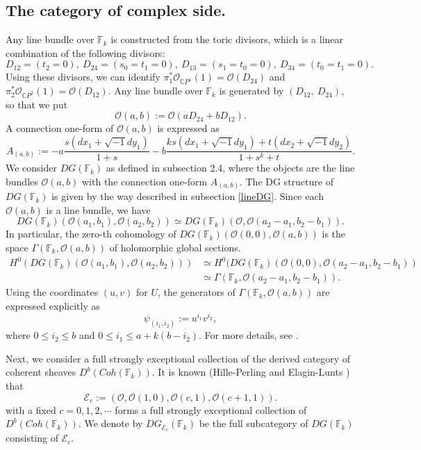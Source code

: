 \documentclass[12pt,reqno]{amsart}
\newcommand{\C}{{\mathbb{C}}}
\newcommand{\F}{{\mathbb{F}}}
\newcommand{\Fk}{{\F_k}}
\newcommand{\cO}{{\mathcal{O}}}
\newcommand{\cE}{{\mathcal{E}}}
\newcommand{\rt}{{\sqrt{-1}}}
\theoremstyle{definition}
\begin{document}
\subsection{The category of complex side.}\label{DGFk}
Any line bundle over $\Fk$ is constructed from the toric divisors, which is a linear combination of the following divisors:
\begin{equation*}
 D_{12}=(t_2=0),\   D_{24}=(s_0=t_1=0),\   D_{13}=(s_1=t_0=0),\ 
 D_{34}=(t_0=t_1=0). 
\end{equation*}
Using these divisors, we can identify $\pi_1^*\cO_{\C P^1}(1)=\cO(D_{24})$ and $\pi_2^*\cO_{\C P^2}(1)=\cO(D_{12})$.
 Any line bundle over $\Fk$ is generated by $(D_{12},\ D_{24})$, so that we put 
 \begin{equation*}
 \cO(a,b):=\cO(aD_{24}+bD_{12}).
 \end{equation*}
A connection one-form of $\cO(a,b)$ is expressed as
 \begin{equation*}
A_{(a,b)}:=-a\frac{s(dx_1+\rt dy_1)}{1+s}  -b\frac{ks(dx_1+\rt dy_1)+t(dx_2+\rt dy_2)}{1+s^k+t}.
\end{equation*}
We consider $DG(\Fk)$ as defined in subsection 2.4, where the objects are the line bundles $\cO(a,b)$ with the connection one-form $A_{(a,b)}$. The DG structure of $DG(\Fk)$ is given by the way described in subsection \ref{lineDG}. Since each $\cO(a,b)$ is a line bundle, we have
\begin{equation*}
DG(\Fk)\left(\cO(a_1,b_1),\cO(a_2,b_2)\right)\simeq DG(\Fk)\left(\cO,\cO(a_2-a_1,b_2-b_1)\right).
\end{equation*}
In particular,  the zero-th cohomology of $DG(\Fk)(\cO(0,0),\cO(a,b))$ is the space $\Gamma(\Fk,\cO(a,b))$ of holomorphic global sections. 
\begin{equation*}
\begin{split}
H^0(DG(\Fk)(\cO(a_1,b_1),\cO(a_2,b_2))) &\simeq H^0(DG(\Fk)(\cO(0,0),\cO(a_2-a_1,b_2-b_1))\\
&\simeq \Gamma(\Fk,\cO(a_2-a_1,b_2-b_1)) .
\end{split}
\end{equation*}
Using the coordinates $(u,v)$ for $U$, the generators of $\Gamma(\Fk,\cO(a,b))$ are expressed explicitly as
\begin{equation*}
\psi_{(i_1,i_2)}:=u^{i_1}v^{i_2},
\end{equation*}
where $0\leq i_2\leq b$ and $0\leq i_1\leq a+k(b-i_2)$. For more details, see \cite{fulton93toric,coxtor,fut-kaj2}. \par
Next, we consider a full strongly exceptional collection of the derived category of coherent sheaves $D^b(Coh(\Fk))$. It is known (Hille-Perling \cite{hille-perling11} and Elagin-Lunts \cite{EL}) that
\begin{equation*}
\cE_c:=(\cO,\cO(1,0),\cO(c,1),\cO(c+1,1)).
\end{equation*}
with a fixed $c=0,1,2,\cdots$ forms a full strongly exceptional collection of $D^b(Coh(\Fk))$. We denote by $DG_{\cE_c}(\Fk)$ be the full subcategory of $DG(\Fk)$ consisting of $\cE_c$.
\end{document}
